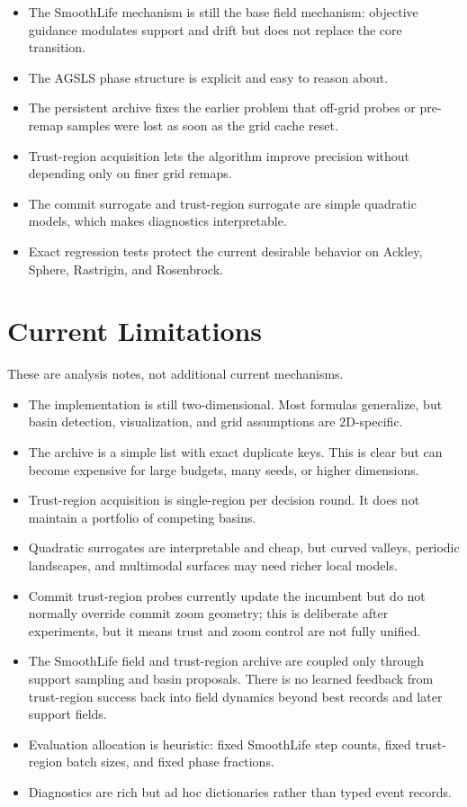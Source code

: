 \documentclass[11pt]{article}
\begin{document}
\begin{itemize}
\item The SmoothLife mechanism is still the base field mechanism: objective
guidance modulates support and drift but does not replace the core transition.
\item The AGSLS phase structure is explicit and easy to reason about.
\item The persistent archive fixes the earlier problem that off-grid probes
or pre-remap samples were lost as soon as the grid cache reset.
\item Trust-region acquisition lets the algorithm improve precision without
depending only on finer grid remaps.
\item The commit surrogate and trust-region surrogate are simple quadratic
models, which makes diagnostics interpretable.
\item Exact regression tests protect the current desirable behavior on
Ackley, Sphere, Rastrigin, and Rosenbrock.
\end{itemize}

\section{Current Limitations}

These are analysis notes, not additional current mechanisms.

\begin{itemize}
\item The implementation is still two-dimensional. Most formulas generalize,
but basin detection, visualization, and grid assumptions are 2D-specific.
\item The archive is a simple list with exact duplicate keys. This is clear
but can become expensive for large budgets, many seeds, or higher dimensions.
\item Trust-region acquisition is single-region per decision round. It does
not maintain a portfolio of competing basins.
\item Quadratic surrogates are interpretable and cheap, but curved valleys,
periodic landscapes, and multimodal surfaces may need richer local models.
\item Commit trust-region probes currently update the incumbent but do not
normally override commit zoom geometry; this is deliberate after experiments,
but it means trust and zoom control are not fully unified.
\item The SmoothLife field and trust-region archive are coupled only through
support sampling and basin proposals. There is no learned feedback from
trust-region success back into field dynamics beyond best records and later
support fields.
\item Evaluation allocation is heuristic: fixed SmoothLife step counts,
fixed trust-region batch sizes, and fixed phase fractions.
\item Diagnostics are rich but ad hoc dictionaries rather than typed event
records.
\end{itemize}
\end{document}
